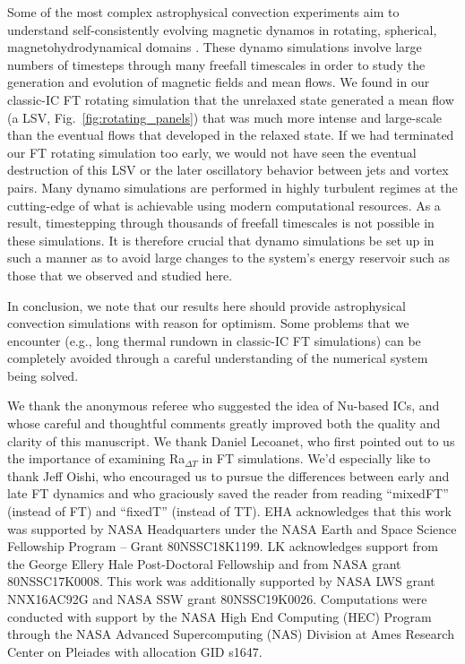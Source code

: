\documentclass[aps, pre, onecolumn, nofootinbib, notitlepage, groupedaddress, amsfonts, amssymb, amsmath, longbibliography, superscriptaddress]{revtex4-1}
\begin{document}
Some of the most complex astrophysical convection experiments aim to understand self-consistently evolving magnetic dynamos in rotating, spherical, magnetohydrodynamical domains \cite{brown&all2010, yadav&all2016, strugarek&all2017, strugarek&all2018}.
These dynamo simulations involve large numbers of timesteps through many freefall timescales in order to study the generation and evolution of magnetic fields and mean flows.
We found in our classic-IC FT rotating simulation that the unrelaxed state generated a mean flow (a LSV, Fig.~\ref{fig:rotating_panels}) that was much more intense and large-scale than the eventual flows that developed in the relaxed state.
If we had terminated our FT rotating simulation too early, we would not have seen the eventual destruction of this LSV or the later oscillatory behavior between jets and vortex pairs.
Many dynamo simulations are performed in highly turbulent regimes at the cutting-edge of what is achievable using modern computational resources.
As a result, timestepping through thousands of freefall timescales is not possible in these simulations.
It is therefore crucial that dynamo simulations be set up in such a manner as to avoid large changes to the system's energy reservoir such as those that we observed and studied here.

In conclusion, we note that our results here should provide astrophysical convection simulations with reason for optimism.
Some problems that we encounter (e.g., long thermal rundown in classic-IC FT simulations) can be completely avoided through a careful understanding of the numerical system being solved.

\begin{acknowledgments}
We thank the anonymous referee who suggested the idea of Nu-based ICs, and whose careful and thoughtful comments greatly improved both the quality and clarity of this manuscript.
We thank Daniel Lecoanet, who first pointed out to us the importance of examining Ra$_{\Delta T}$ in FT simulations. 
We'd especially like to thank Jeff Oishi, who encouraged us to pursue the differences between early and late FT dynamics and who graciously saved the reader from reading ``mixedFT'' (instead of FT) and ``fixedT'' (instead of TT).
EHA acknowledges that this work was supported by NASA Headquarters under the NASA Earth and Space Science Fellowship Program -- Grant 80NSSC18K1199.
LK acknowledges support from the George Ellery Hale Post-Doctoral Fellowship and from NASA grant 80NSSC17K0008.
This work was additionally supported by NASA LWS grant NNX16AC92G and NASA SSW grant 80NSSC19K0026. 
Computations were conducted with support by the NASA High End Computing (HEC) Program through the NASA  Advanced Supercomputing (NAS) Division at Ames Research Center on Pleiades with allocation GID s1647.
\end{acknowledgments}
\end{document}
